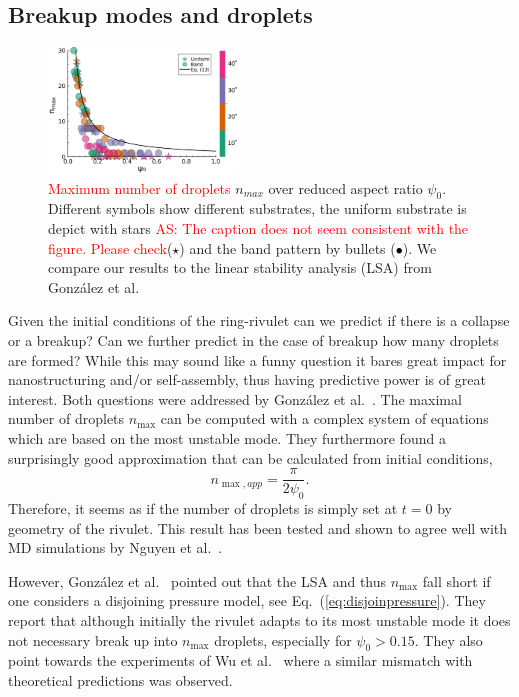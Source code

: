 \documentclass[twoside,twocolumn,9pt]{article}
\begin{document}
\subsection{Breakup modes and droplets}\label{subsec:drop-counting}
\begin{figure}
    \centering
    \includegraphics[width=0.45\textwidth]{assets/maxdropsUniBandCC.pdf}
    \caption{\textcolor{red}{Maximum number of droplets} $n_{max}$ over reduced aspect ratio $\psi_0$.
    Different symbols show different substrates, the uniform substrate is depict with stars 
    \textcolor{red}{AS: The caption does not seem consistent with the figure. Please check}(\textcolor{black}{$\star$}) and the band pattern by bullets (\textcolor{black}{$\bullet$}).
    We compare our results to the linear stability analysis (LSA) from Gonz{\'a}lez et al.~\cite{gonzalezStabilityLiquidRing2013}}
    \label{fig:max_drops}
\end{figure}

Given the initial conditions of the ring-rivulet can we predict if there is a collapse or a breakup? 
Can we further predict in the case of breakup how many droplets are formed?
While this may sound like a funny question it bares great impact for nanostructuring and/or self-assembly, thus having predictive power is of great interest.
Both questions were addressed by Gonz{\'a}lez et al.~\cite{gonzalezStabilityLiquidRing2013}. 
The maximal number of droplets $n_{\max}$ can be computed with a complex system of equations which are based on the most unstable mode.
They furthermore found a surprisingly good approximation that can be calculated from initial conditions, 
\begin{equation}\label{eq:maxDrops}
    n_{\max, app} = \frac{\pi}{2\psi_0}.
\end{equation}
Therefore, it seems as if the number of droplets is simply set at $t=0$ by geometry of the rivulet.
This result has been tested and shown to agree well with MD simulations by Nguyen et al.~\cite{nguyenCompetitionCollapseBreakup2012}. 

However, Gonz{\'a}lez et al.~\cite{gonzalezStabilityLiquidRing2013} pointed out that the LSA and thus $n_{\max}$ fall short if one considers a disjoining pressure model, see Eq.~(\ref{eq:disjoinpressure}).
They report that although initially the rivulet adapts to its most unstable mode it does not necessary break up into $n_{\max}$ droplets, especially for $\psi_0 > 0.15$. 
They also point towards the experiments of Wu et al.~\cite{wuCompetingLiquidPhase2011} where a similar mismatch with theoretical predictions was observed.
\end{document}
